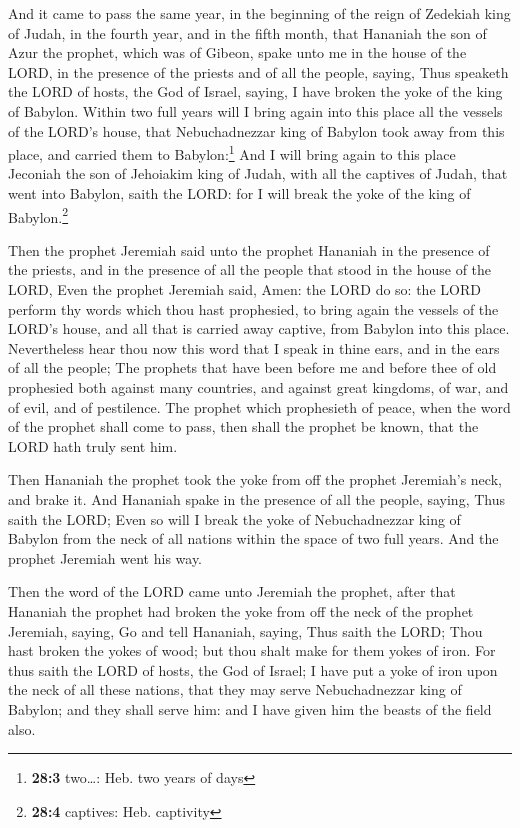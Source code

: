  And it came to pass the same year, in the beginning of
the reign of Zedekiah king of Judah, in the fourth year, and in the
fifth month, that Hananiah the son of Azur the prophet, which was of
Gibeon, spake unto me in the house of the LORD, in the presence of the
priests and of all the people, saying,  Thus speaketh the
LORD of hosts, the God of Israel, saying, I have broken the yoke of the
king of Babylon.  Within two full years will I bring again
into this place all the vessels of the LORD's house, that Nebuchadnezzar
king of Babylon took away from this place, and carried them to
Babylon:\footnote{\textbf{28:3} two\ldots: Heb. two years of days}
 And I will bring again to this place Jeconiah the son of
Jehoiakim king of Judah, with all the captives of Judah, that went into
Babylon, saith the LORD: for I will break the yoke of the king of
Babylon.\footnote{\textbf{28:4} captives: Heb. captivity}

 Then the prophet Jeremiah said unto the prophet Hananiah
in the presence of the priests, and in the presence of all the people
that stood in the house of the LORD,  Even the prophet
Jeremiah said, Amen: the LORD do so: the LORD perform thy words which
thou hast prophesied, to bring again the vessels of the LORD's house,
and all that is carried away captive, from Babylon into this place.
 Nevertheless hear thou now this word that I speak in
thine ears, and in the ears of all the people;  The
prophets that have been before me and before thee of old prophesied both
against many countries, and against great kingdoms, of war, and of evil,
and of pestilence.  The prophet which prophesieth of
peace, when the word of the prophet shall come to pass, then shall the
prophet be known, that the LORD hath truly sent him.

 Then Hananiah the prophet took the yoke from off the
prophet Jeremiah's neck, and brake it.  And Hananiah
spake in the presence of all the people, saying, Thus saith the LORD;
Even so will I break the yoke of Nebuchadnezzar king of Babylon from the
neck of all nations within the space of two full years. And the prophet
Jeremiah went his way.

 Then the word of the LORD came unto Jeremiah the
prophet, after that Hananiah the prophet had broken the yoke from off
the neck of the prophet Jeremiah, saying,  Go and tell
Hananiah, saying, Thus saith the LORD; Thou hast broken the yokes of
wood; but thou shalt make for them yokes of iron.  For
thus saith the LORD of hosts, the God of Israel; I have put a yoke of
iron upon the neck of all these nations, that they may serve
Nebuchadnezzar king of Babylon; and they shall serve him: and I have
given him the beasts of the field also.

